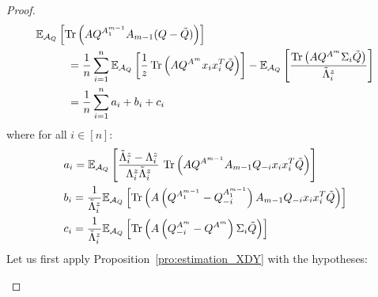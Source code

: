 \documentclass[a4papaer, titlepage]{book}
\begin{document}
\begin{proof}
  \begin{align*}%
    &\mathbb{E}_{\mathcal A_Q}\left[ \tr \left( AQ^{A_1^{m-1}} A_{m-1} ( Q- \tilde Q) \right)\right]\\
    &\hspace{1cm}=\frac{1}{n}\sum_{i=1}^n\mathbb{E}_{\mathcal A_Q}\left[ \frac{1}{z} \tr \left( A Q^{A^{m}} x_i x_i^T\tilde Q \right)\right] - \mathbb{E}_{\mathcal A_Q}\left[\frac{\tr \left( A Q^{A^{m}} \Sigma_i \tilde Q \right)}{\tilde \Lambda_i^z}\right] \\
    &\hspace{1cm}= \frac{1}{n}\sum_{i=1}^n  a_i + b_i + c_i %
  \end{align*}
  where for all $i\in [n]$:
  \begin{align*}
    & a_i
    = \mathbb{E}_{\mathcal A_Q} \left[\frac{\tilde \Lambda_i^z - \Lambda_i^z}{ \Lambda_i^z\tilde \Lambda_i^z} \, \operatorname{Tr} \left( A Q^{A^{m-1}}A_{m-1}Q_{-i}x_ix_i^T\tilde Q \right) \right]  \\
    &b_i 
     = \frac{1}{\tilde \Lambda_i^z}\mathbb{E}_{\mathcal A_Q}\left[ \operatorname{Tr} \left( A \left(Q^{A^{m-1}_1}-Q_{-i}^{A^{m-1}_1}\right) A_{m-1}Q_{-i}x_ix_i^T\tilde Q \right)\right] \\
    &c_i 
    =  \frac{1}{\tilde \Lambda_i^z}\mathbb{E}_{\mathcal A_Q}\left[ \operatorname{Tr} \left( A \left(Q_{-i}^{A^{m}} - Q^{A^{m}} \right)\Sigma_i  \tilde Q \right)\right]
  \end{align*}
  Let us first apply Proposition~\ref{pro:estimation_XDY} with the hypotheses:
   \begin{itemize}

\end{itemize}
\end{proof}
\end{document}

